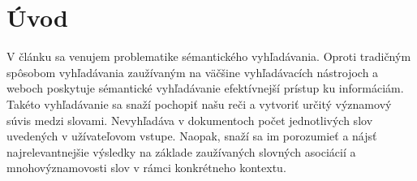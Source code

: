 \documentclass{article}
\begin{document}
\section{Úvod}
V článku sa venujem problematike sémantického vyhľadávania. Oproti tradičným spôsobom vyhľadávania zaužívaným na väčšine vyhľadávacích nástrojoch a weboch poskytuje sémantické vyhľadávanie efektívnejší prístup ku informáciám. Takéto vyhľadávanie sa snaží pochopiť našu reči a vytvoriť určitý významový súvis medzi slovami. Nevyhľadáva v dokumentoch počet jednotlivých slov uvedených v užívateľovom vstupe. Naopak, snaží sa im porozumieť a nájsť najrelevantnejšie výsledky na základe zaužívaných slovných asociácií a mnohovýznamovosti slov v rámci konkrétneho kontextu. 

\cite{1}



\end{document}
